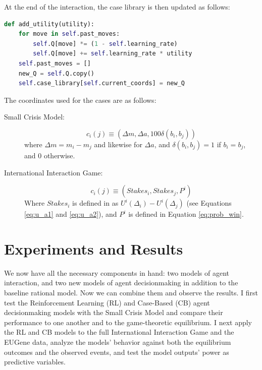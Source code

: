 At the end of the interaction, the case library is then updated as follows:

\begin{singlespace}
\begin{lstlisting}[language=python,caption={Case-Based Learning -- Update Weights},label={code:cb_update}]
def add_utility(utility):
    for move in self.past_moves:
        self.Q[move] *= (1 - self.learning_rate)
        self.Q[move] += self.learning_rate * utility
    self.past_moves = []
    new_Q = self.Q.copy()
    self.case_library[self.current_coords] = new_Q
\end{lstlisting}
\end{singlespace}

The coordinates used for the cases are as follows:

\begin{description}
	\item[Small Crisis Model:] \begin{equation}
	c_i(j) \equiv (\Delta m, \Delta a, 100\delta(b_i,b_j))
	\end{equation}
	where $\Delta m = m_i - m_j$ and likewise for $\Delta a$, and $\delta(b_i,b_j)=1$ if $b_i=b_j$, and $0$ otherwise.
	\item[International Interaction Game:]\begin{equation}
	c_i(j) \equiv (Stakes_i, Stakes_j, P^i)
	\end{equation}
	Where $Stakes_i$ is defined in \citet{bdm_1992} as $U^i(\Delta_i) - U^i(\Delta_j)$ (see Equations \ref{eq:u_a1} and \ref{eq:u_a2}), and $P^i$ is defined in Equation \ref{eq:prob_win}.
\end{description}

\section{Experiments and Results}\label{experiments-and-results}

We now have all the necessary components in hand: two models of agent interaction, and two new models of agent decisionmaking in addition to the baseline rational model. Now we can combine them and observe the results. I first test the Reinforcement Learning (RL) and Case-Based (CB) agent decisionmaking models with the Small Crisis Model and compare their performance to one another and to the game-theoretic equilibrium. I next apply the RL and CB models to the full International Interaction Game and the EUGene data, analyze the models' behavior against both the equilibrium outcomes and the observed events, and test the model outputs' power as predictive variables. 

